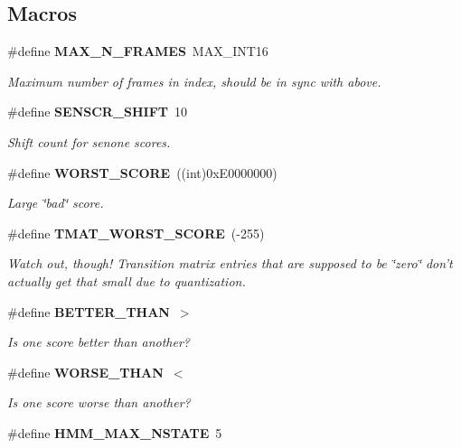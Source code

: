\subsection*{Macros}
\begin{DoxyCompactItemize}
\item 
\#define {\bf M\-A\-X\-\_\-\-N\-\_\-\-F\-R\-A\-M\-E\-S}~M\-A\-X\-\_\-\-I\-N\-T16\label{hmm_8h_a5b6b9157cfaaec312508eaed602f0698}

\begin{DoxyCompactList}\small\item\em Maximum number of frames in index, should be in sync with above. \end{DoxyCompactList}\item 
\#define {\bf S\-E\-N\-S\-C\-R\-\_\-\-S\-H\-I\-F\-T}~10
\begin{DoxyCompactList}\small\item\em Shift count for senone scores. \end{DoxyCompactList}\item 
\#define {\bf W\-O\-R\-S\-T\-\_\-\-S\-C\-O\-R\-E}~((int)0x\-E0000000)
\begin{DoxyCompactList}\small\item\em Large \char`\"{}bad\char`\"{} score. \end{DoxyCompactList}\item 
\#define {\bf T\-M\-A\-T\-\_\-\-W\-O\-R\-S\-T\-\_\-\-S\-C\-O\-R\-E}~(-\/255)\label{hmm_8h_a9b38399b544dbb93bc9b7d0094e91db7}

\begin{DoxyCompactList}\small\item\em Watch out, though! Transition matrix entries that are supposed to be \char`\"{}zero\char`\"{} don't actually get that small due to quantization. \end{DoxyCompactList}\item 
\#define {\bf B\-E\-T\-T\-E\-R\-\_\-\-T\-H\-A\-N}~$>$\label{hmm_8h_a2874ab52613ff781c96f570ec0eb0d98}

\begin{DoxyCompactList}\small\item\em Is one score better than another? \end{DoxyCompactList}\item 
\#define {\bf W\-O\-R\-S\-E\-\_\-\-T\-H\-A\-N}~$<$\label{hmm_8h_aa930fb8fb6fce7f34bcf4018b81d7066}

\begin{DoxyCompactList}\small\item\em Is one score worse than another? \end{DoxyCompactList}\item 
\#define {\bf H\-M\-M\-\_\-\-M\-A\-X\-\_\-\-N\-S\-T\-A\-T\-E}~5\label{hmm_8h_a1eb055ab0e55008f27d78e7b07a55a1c}


\end{DoxyCompactItemize}
